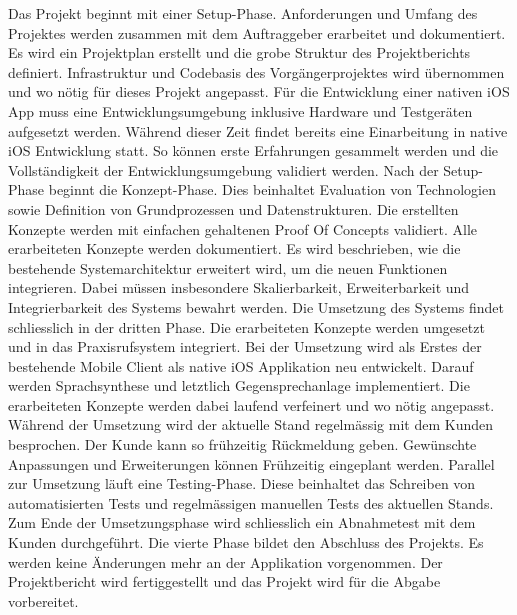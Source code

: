 Das Projekt beginnt mit einer Setup-Phase.
Anforderungen und Umfang des Projektes werden zusammen mit dem Auftraggeber erarbeitet und dokumentiert.
Es wird ein Projektplan erstellt und die grobe Struktur des Projektberichts definiert.
Infrastruktur und Codebasis des Vorgängerprojektes wird übernommen und wo nötig für dieses Projekt angepasst.
Für die Entwicklung einer nativen iOS App muss eine Entwicklungsumgebung inklusive Hardware und Testgeräten aufgesetzt werden.
Während dieser Zeit findet bereits eine Einarbeitung in native iOS Entwicklung statt.
So können erste Erfahrungen gesammelt werden und die Vollständigkeit der Entwicklungsumgebung validiert werden.
Nach der Setup-Phase beginnt die Konzept-Phase.
Dies beinhaltet Evaluation von Technologien sowie Definition von Grundprozessen und Datenstrukturen.
Die erstellten Konzepte werden mit einfachen gehaltenen Proof Of Concepts validiert.
Alle erarbeiteten Konzepte werden dokumentiert.
Es wird beschrieben, wie die bestehende Systemarchitektur erweitert wird, um die neuen Funktionen integrieren.
Dabei müssen insbesondere Skalierbarkeit, Erweiterbarkeit und Integrierbarkeit des Systems bewahrt werden.
Die Umsetzung des Systems findet schliesslich in der dritten Phase.
Die erarbeiteten Konzepte werden umgesetzt und in das Praxisrufsystem integriert.
Bei der Umsetzung wird als Erstes der bestehende Mobile Client als native iOS Applikation neu entwickelt.
Darauf werden Sprachsynthese und letztlich Gegensprechanlage implementiert.
Die erarbeiteten Konzepte werden dabei laufend verfeinert und wo nötig angepasst.
Während der Umsetzung wird der aktuelle Stand regelmässig mit dem Kunden besprochen.
Der Kunde kann so frühzeitig Rückmeldung geben.
Gewünschte Anpassungen und Erweiterungen können Frühzeitig eingeplant werden.
Parallel zur Umsetzung läuft eine Testing-Phase.
Diese beinhaltet das Schreiben von automatisierten Tests und regelmässigen manuellen Tests des aktuellen Stands.
Zum Ende der Umsetzungsphase wird schliesslich ein Abnahmetest mit dem Kunden durchgeführt.
Die vierte Phase bildet den Abschluss des Projekts.
Es werden keine Änderungen mehr an der Applikation vorgenommen.
Der Projektbericht wird fertiggestellt und das Projekt wird für die Abgabe vorbereitet.

\clearpage
